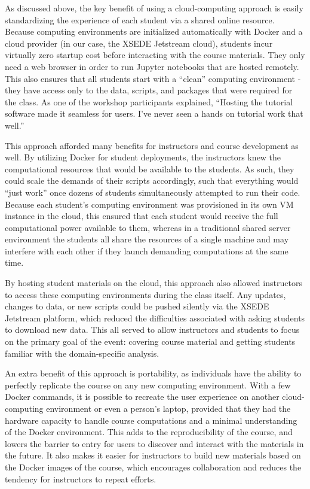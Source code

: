 As discussed above, the key benefit of using a cloud-computing approach is
easily standardizing the experience of each student via a shared online
resource. Because computing environments are initialized automatically with
Docker and a cloud provider (in our case, the XSEDE Jetstream cloud),
students incur virtually zero startup cost
before interacting with the course materials. They only need a web browser in
order to run Jupyter notebooks that are hosted remotely.
This also ensures that all students
start with a ``clean'' computing environment - they have access only to the data,
scripts, and packages that were required for the class. As one of the workshop
participants explained, ``Hosting
the tutorial software made it seamless for users. I've never seen a hands on
tutorial work that well.''

This approach afforded many benefits for instructors and course development as
well. By utilizing Docker for student deployments, the instructors knew the
computational resources that would be available to the students. As such, they
could scale the demands of their scripts accordingly, such that everything would
``just work'' once dozens of students simultaneously attempted to run their
code. Because each student's computing environment was provisioned in its own VM
instance in the cloud, this ensured that each student would receive the full
computational power available to them, whereas in a traditional shared server
environment the students all share the resources of a single machine and may
interfere with each other if they launch demanding computations at the same
time.

By hosting student materials on the cloud, this approach also allowed instructors
to access these computing environments during the class itself. Any updates,
changes to data, or new scripts could be pushed silently via the XSEDE Jetstream
platform, which reduced the difficulties associated with asking students to
download new data. This all served to allow instructors and students to focus on
the primary goal of the event: covering course material and getting students
familiar with the domain-specific analysis.

An extra benefit of this approach is portability, as individuals have the
ability to perfectly replicate the course on any new computing environment. With
a few Docker commands, it is possible to recreate the user experience on another
cloud-computing environment or even a person's laptop, provided that they had
the hardware capacity to handle course computations and a minimal understanding
of the Docker environment. This adds to the reproducibility of the course, and
lowers the barrier to entry for users to discover and interact with the
materials in the future. It also makes it easier for instructors to build new
materials based on the Docker images of the course, which encourages
collaboration and reduces the tendency for instructors to repeat efforts.

